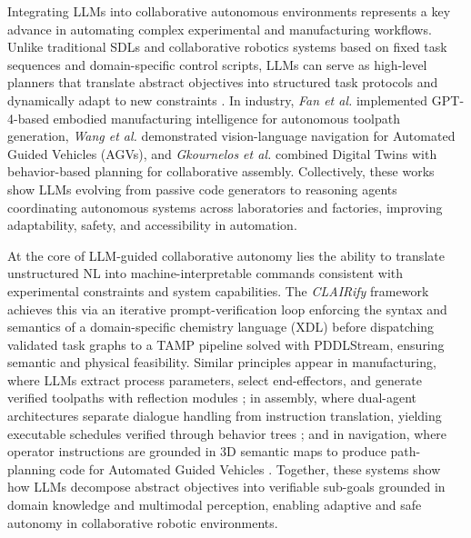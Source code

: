 
Integrating LLMs into collaborative autonomous environments represents a key advance in automating complex experimental and manufacturing workflows. Unlike traditional SDLs and collaborative robotics systems based on fixed task sequences and domain-specific control scripts, LLMs can serve as high-level planners that translate abstract objectives into structured task protocols and dynamically adapt to new constraints \cite{yoshikawa2023large, kitchin2025evolving, xie2025toward, ruehle2025workflow}. In industry, \emph{Fan et al.} \cite{fan2025embodied} implemented GPT-4-based embodied manufacturing intelligence for autonomous toolpath generation, \emph{Wang et al.} \cite{wang2024llm} demonstrated vision-language navigation for Automated Guided Vehicles (AGVs), and \emph{Gkournelos et al.} \cite{gkournelos2024llm} combined Digital Twins with behavior-based planning for collaborative assembly. Collectively, these works show LLMs evolving from passive code generators to reasoning agents coordinating autonomous systems across laboratories and factories, improving adaptability, safety, and accessibility in automation.


At the core of LLM-guided collaborative autonomy lies the ability to translate unstructured NL into machine-interpretable commands consistent with experimental constraints and system capabilities. The \emph{CLAIRify} framework \cite{yoshikawa2023large} achieves this via an iterative prompt-verification loop enforcing the syntax and semantics of a domain-specific chemistry language (XDL) before dispatching validated task graphs to a TAMP pipeline solved with PDDLStream, ensuring semantic and physical feasibility. Similar principles appear in manufacturing, where LLMs extract process parameters, select end-effectors, and generate verified toolpaths with reflection modules \cite{fan2025embodied}; in assembly, where dual-agent architectures separate dialogue handling from instruction translation, yielding executable schedules verified through behavior trees \cite{gkournelos2024llm}; and in navigation, where operator instructions are grounded in 3D semantic maps to produce path-planning code for Automated Guided Vehicles \cite{wang2024llm}. Together, these systems show how LLMs decompose abstract objectives into verifiable sub-goals grounded in domain knowledge and multimodal perception, enabling adaptive and safe autonomy in collaborative robotic environments.

